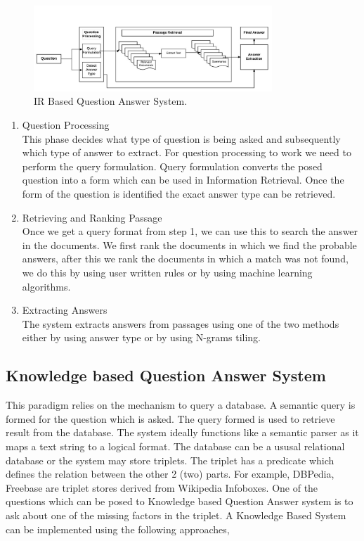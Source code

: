 \begin{figure}[htb]
\centering
\includegraphics[width=0.8\textwidth]{images/IR_BasedQA.jpg}
\caption{IR Based Question Answer System.} 
\label{fig:IR_BasedQA}
\end{figure}

\begin{enumerate}	
\item Question Processing \\
This phase decides what type of question is being asked and subsequently which type of answer to 
extract. For question processing to work we need to perform the query formulation. Query formulation converts the posed question into a form which can be used in Information Retrieval. Once the form of the question is identified the exact answer type can be retrieved. 
	
\item Retrieving and Ranking Passage \\
Once we get a query format from step 1, we can use this to search the answer in the documents.
We first rank the documents in which we find the probable answers, after this we rank the documents in which a match was not found, we do this by using user written rules or by using machine learning algorithms.
	
\item Extracting Answers \\
The system extracts answers from passages using one of the two methods either by using answer type or by using N-grams tiling.
\end{enumerate}

\subsection{Knowledge based Question Answer System}
This paradigm relies on the mechanism to query a database. A semantic query is formed for the question which is asked. The query formed is used to retrieve result from the database. The system ideally functions like a semantic parser as it maps a text string to a logical format. The database can be a ususal relational database or the system may store triplets. The triplet has a predicate which defines the relation between the other 2 (two) parts. For example, DBPedia, Freebase are triplet stores derived from Wikipedia Infoboxes. One of the questions which can be posed to Knowledge based Question Answer system is to ask about one of the missing factors in the triplet. A Knowledge Based System can be implemented using the following approaches,

